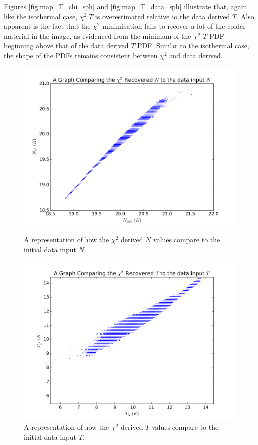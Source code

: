 \documentclass{report}
\begin{document}
Figures \ref{fig:map_T_chi_sph} and \ref{fig:map_T_data_sph} illustrate that, again like the isothermal case, $\chi^{2}$ $T$ is overestimated relative to the data derived $T$. Also apparent is the fact that the $\chi^{2}$ minimisation fails to recover a lot of the colder material in the image, as evidenced from the minimum of the $\chi^{2}$ $T$ PDF beginning above that of the data derived $T$ PDF. Similar to the isothermal case, the shape of the PDFs remains consistent between $\chi^{2}$ and data derived.

\begin{figure}[H]
  \includegraphics[width=\linewidth]{../img/sph/N.png}
  \caption{A representation of how the $\chi^{2}$ derived $N$ values compare to the initial data input $N$.}\label{fig:sph_T}
\endminipage\hfill
{}
  \includegraphics[width=\linewidth]{../img/sph/T.png}
  \caption{A representation of how the $\chi^{2}$ derived $T$ values compare to the initial data input $T$.}\label{fig:sph_N}
\endminipage
\end{figure}
\end{document}
